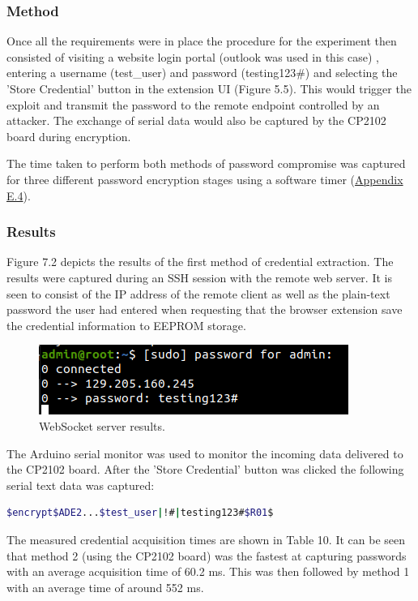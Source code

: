\subsubsection{Method}
Once all the requirements were in place the procedure for the experiment then consisted of visiting a website login portal (outlook was used in this case) , entering a username (test\_user) and password (testing123\#) and selecting the 'Store Credential' button in the extension UI (Figure 5.5). This would trigger the exploit and transmit the password to the remote endpoint controlled by an attacker. The exchange of serial data would also be captured by the CP2102 board during encryption. 

The time taken to perform both methods of password compromise was captured for three different password encryption stages using a software timer (\hyperref[sec:timerp]{Appendix E.4}).
\subsubsection{Results}
Figure 7.2 depicts the results of the first method of credential extraction. The results were captured during an SSH session with the remote web server. It is seen to consist of the IP address of the remote client as well as the plain-text password the user had entered when requesting that the browser extension save the credential information to EEPROM storage. 

\begin{figure}[H]
\centering
\includegraphics[width=0.6\columnwidth]{Figures/Fig_28.png}
\caption{WebSocket server results.}
\label{fig:gantt}
\end{figure}

The Arduino serial monitor was used to monitor the incoming data delivered to the CP2102 board. After the 'Store Credential' button was clicked the following serial text data was captured:

\begin{lstlisting}[language=bash, frame=none]
$encrypt$ADE2...$test_user|!#|testing123#$R01$
\end{lstlisting}

The measured credential acquisition times are shown in Table 10. It can be seen that method 2 (using the CP2102 board) was the fastest at capturing passwords with an average acquisition time of 60.2 ms. This was then followed by method 1 with an average time of around 552 ms.

